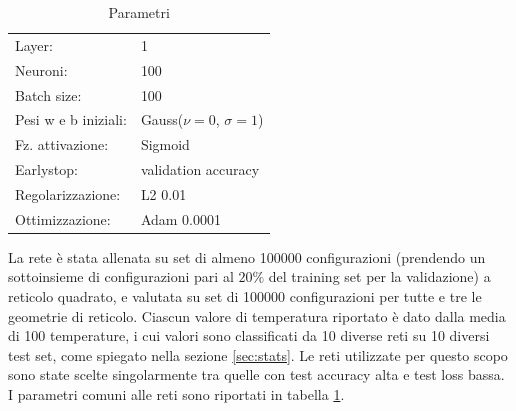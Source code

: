 \documentclass{article}
\begin{document}
\begin{table}[ht]
\begin{center}
\begin{tabular}{ll}
\toprule
Layer: & 1\\
Neuroni: & 100 \\
Batch size: & 100\\
Pesi w e b iniziali: & Gauss($\nu=0$, $\sigma=1$)\\
Fz. attivazione: & Sigmoid\\
Earlystop: & validation accuracy \\
Regolarizzazione: & L2 0.01\\
Ottimizzazione: & Adam 0.0001 \\
\bottomrule
\end{tabular}
\end{center}
\caption{Parametri}
\label{tab:ffnnpar}
\end{table}

La rete è stata allenata su set di almeno \num{100000} configurazioni (prendendo un sottoinsieme di configurazioni pari al $20\%$ del training set per la validazione) a reticolo quadrato, e valutata su set di \num{100000} configurazioni per tutte e tre le geometrie di reticolo.
Ciascun valore di temperatura riportato è dato dalla media di 100 temperature, i cui valori sono classificati da 10 diverse reti su 10 diversi test set, come spiegato nella sezione \ref{sec:stats}.
Le reti utilizzate per questo scopo sono state scelte singolarmente tra quelle con test accuracy alta e test loss bassa.
I parametri comuni alle reti sono riportati in tabella \ref{tab:ffnnpar}.
\end{document}

